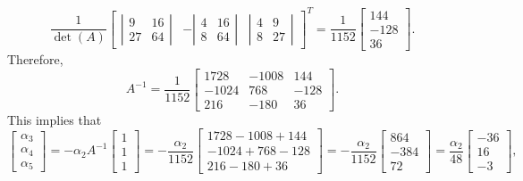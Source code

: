 \documentclass{homework}
\begin{document}
	\begin{equation}
	\frac{1}{\det(A)}\left[\begin{matrix}
		\left|\begin{matrix}
			9 & 16 \\ 27 & 64
		\end{matrix}\right| &
		-\left|\begin{matrix}
			4 & 16 \\ 8 & 64
		\end{matrix}\right| &
		\left|\begin{matrix}
			4 & 9 \\ 8 & 27
		\end{matrix}\right|
	\end{matrix}\right]^T = \frac{1}{1152} \left[\begin{matrix}
		144 \\ -128 \\ 36
	\end{matrix}\right].
	\end{equation}
	Therefore,
	\begin{equation}
		A^{-1} = \frac{1}{1152}\left[\begin{matrix}
			1728 & -1008 & 144 \\
			-1024 & 768 & -128 \\
			216 & -180 & 36
		\end{matrix}\right].
	\end{equation}
	This implies that
	\begin{equation}
		\left[\begin{matrix}
			\alpha_3 \\ \alpha_4 \\ \alpha_5
		\end{matrix}\right] =
		-\alpha_2A^{-1}\left[\begin{matrix}
			1\\1\\1
		\end{matrix}\right]=
		-\frac{\alpha_2}{1152}\left[\begin{matrix}
			1728 - 1008 +144 \\ -1024 + 768 -128 \\ 216-180 + 36
		\end{matrix}\right] =-\frac{\alpha_2}{1152}\left[\begin{matrix}
			864 \\ -384 \\ 72
		\end{matrix}\right] = \frac{\alpha_2}{48}\left[\begin{matrix}
			-36 \\ 16 \\ -3
		\end{matrix}\right],
	\end{equation}
\end{document}
